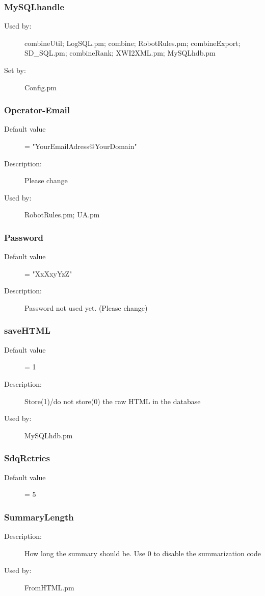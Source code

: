 \subsubsection{MySQLhandle}
\label{MySQLhandle}
\begin{description}
\item[Used by:] combineUtil; LogSQL.pm; combine; RobotRules.pm; combineExport; SD\_SQL.pm; combineRank; XWI2XML.pm; MySQLhdb.pm
\item[Set by:] Config.pm
\end{description}
\subsubsection{Operator-Email}
\label{Operator-Email}
\begin{description}
\item[Default value] = "YourEmailAdress@YourDomain"
\item[Description:] Please change
\item[Used by:] RobotRules.pm; UA.pm
\end{description}
\subsubsection{Password}
\label{Password}
\begin{description}
\item[Default value] = "XxXxyYzZ"
\item[Description:] Password not used yet. (Please change)
\end{description}
\subsubsection{saveHTML}
\label{saveHTML}
\begin{description}
\item[Default value] = 1
\item[Description:] Store(1)/do not store(0) the raw HTML in the database
\item[Used by:] MySQLhdb.pm
\end{description}
\subsubsection{SdqRetries}
\label{SdqRetries}
\begin{description}
\item[Default value] = 5
\end{description}
\subsubsection{SummaryLength}
\label{SummaryLength}
\begin{description}
\item[Description:] How long the summary should be. Use 0 to disable the summarization code
\item[Used by:] FromHTML.pm
\end{description}
